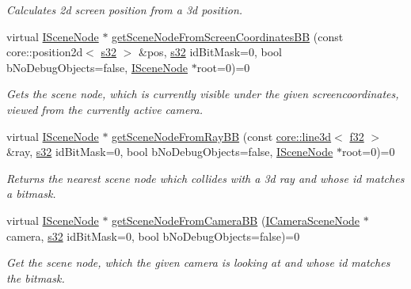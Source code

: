 \begin{DoxyCompactItemize}
\begin{DoxyCompactList}\small\item\em Calculates 2d screen position from a 3d position. \end{DoxyCompactList}\item 
virtual \hyperlink{classirr_1_1scene_1_1ISceneNode}{I\+Scene\+Node} $\ast$ \hyperlink{classirr_1_1scene_1_1ISceneCollisionManager_aca97a47ae237373bbd681268a462f4a0}{get\+Scene\+Node\+From\+Screen\+Coordinates\+BB} (const core\+::position2d$<$ \hyperlink{namespaceirr_ac66849b7a6ed16e30ebede579f9b47c6}{s32} $>$ \&pos, \hyperlink{namespaceirr_ac66849b7a6ed16e30ebede579f9b47c6}{s32} id\+Bit\+Mask=0, bool b\+No\+Debug\+Objects=false, \hyperlink{classirr_1_1scene_1_1ISceneNode}{I\+Scene\+Node} $\ast$root=0)=0
\begin{DoxyCompactList}\small\item\em Gets the scene node, which is currently visible under the given screencoordinates, viewed from the currently active camera. \end{DoxyCompactList}\item 
virtual \hyperlink{classirr_1_1scene_1_1ISceneNode}{I\+Scene\+Node} $\ast$ \hyperlink{classirr_1_1scene_1_1ISceneCollisionManager_a420ffad2d3a8bcd2f51b504cb8709ac6}{get\+Scene\+Node\+From\+Ray\+BB} (const \hyperlink{classirr_1_1core_1_1line3d}{core\+::line3d}$<$ \hyperlink{namespaceirr_a0277be98d67dc26ff93b1a6a1d086b07}{f32} $>$ \&ray, \hyperlink{namespaceirr_ac66849b7a6ed16e30ebede579f9b47c6}{s32} id\+Bit\+Mask=0, bool b\+No\+Debug\+Objects=false, \hyperlink{classirr_1_1scene_1_1ISceneNode}{I\+Scene\+Node} $\ast$root=0)=0
\begin{DoxyCompactList}\small\item\em Returns the nearest scene node which collides with a 3d ray and whose id matches a bitmask. \end{DoxyCompactList}\item 
virtual \hyperlink{classirr_1_1scene_1_1ISceneNode}{I\+Scene\+Node} $\ast$ \hyperlink{classirr_1_1scene_1_1ISceneCollisionManager_ab29e0a261409a95a20e15ee09cc0de64}{get\+Scene\+Node\+From\+Camera\+BB} (\hyperlink{classirr_1_1scene_1_1ICameraSceneNode}{I\+Camera\+Scene\+Node} $\ast$camera, \hyperlink{namespaceirr_ac66849b7a6ed16e30ebede579f9b47c6}{s32} id\+Bit\+Mask=0, bool b\+No\+Debug\+Objects=false)=0
\begin{DoxyCompactList}\small\item\em Get the scene node, which the given camera is looking at and whose id matches the bitmask. \end{DoxyCompactList}\item 

\end{DoxyCompactItemize}
